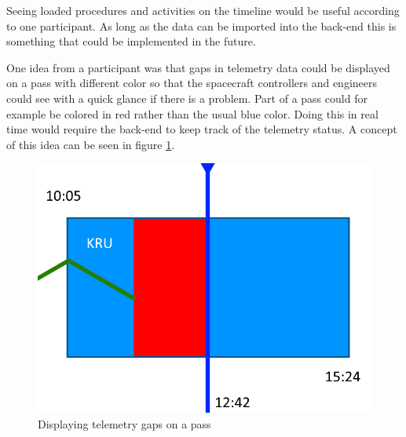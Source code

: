 Seeing loaded procedures and activities on the timeline would be useful according to one participant. As long as the data can be imported into the back-end this is something that could be implemented in the future.

One idea from a participant was that gaps in telemetry data could be displayed on a pass with different color so that the spacecraft controllers and engineers could see with a quick glance if there is a problem. Part of a pass could for example be colored in red rather than the usual blue color. Doing this in real time would require the back-end to keep track of the telemetry status. A concept of this idea can be seen in figure \ref{fig:concept}.

\begin{figure}[ht]
  \begin{center}
    \includegraphics*[width=1\textwidth]{concept}
  \end{center}
  \caption{Displaying telemetry gaps on a pass}
  \label{fig:concept}
\end{figure}